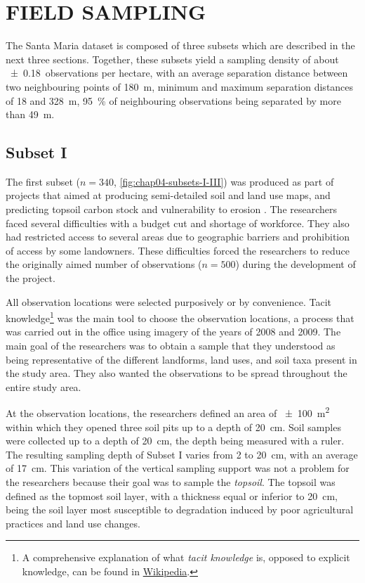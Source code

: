 \section{FIELD SAMPLING}
\label{sec:chap04-sampling}

The Santa Maria dataset is composed of three subsets which are described in the next three sections. Together, 
these subsets yield a sampling density of about \num{\pm0.18}~observations per hectare, with an average 
separation distance between two neighbouring points of \SI{180}{\metre}, minimum and maximum separation 
distances of \num{18} and \SI{328}{\metre}, \SI{95}{\percent} of neighbouring observations being separated by 
more than \SI{49}{\metre}.

\subsection{Subset I}

The first subset ($n = 340$, \autoref{fig:chap04-subsets-I-III}) was produced as part of projects that aimed 
at producing semi-detailed soil and land use maps, and predicting topsoil carbon stock and vulnerability to 
erosion \cite{Samuel-Rosa2009, SamuelRosaEtAl2011a, MiguelEtAl2012, Moura-BuenoEtAl2012, Samuel-RosaEtAl2013}. 
The researchers faced several difficulties with a budget cut and shortage of workforce. They also had 
restricted access to several areas due to geographic barriers and prohibition of access by some landowners. 
These difficulties forced the researchers to reduce the originally aimed number of observations ($n = 500$) 
during the development of the project.

\def\foottacit{\footnote{A comprehensive explanation of what \emph{tacit knowledge} is, opposed to explicit 
knowledge, can be found in \href{https://en.wikipedia.org/wiki/Tacit_knowledge}{Wikipedia}.}}

All observation locations were selected purposively or by convenience. Tacit knowledge\foottacit{} was the 
main tool to choose the observation locations, a process that was carried out in the office using 
\googleearth{} imagery of the years of \num{2008} and \num{2009}. The main goal of the researchers was to 
obtain a sample that they understood as being representative of the different landforms, land uses, and soil 
taxa present in the study area. They also wanted the observations to be spread throughout the entire study 
area.

At the observation locations, the researchers defined an area of \SI{\pm100}{\metre\squared} within which they 
opened three soil pits up to a depth of \SI{20}{\centi\metre}. Soil samples were collected up to a depth of 
\SI{20}{\centi\metre}, the depth being measured with a ruler. The resulting sampling depth of Subset I varies 
from \num{2} to \SI{20}{\centi\metre}, with an average of \SI{17}{\centi\metre}. This variation of the 
vertical sampling support was not a problem for the researchers because their goal was to sample the 
\emph{topsoil}. The topsoil was defined as the topmost soil layer, with a thickness equal or inferior to 
\SI{20}{\centi\metre}, being the soil layer most susceptible to degradation induced by poor agricultural 
practices and land use changes.

